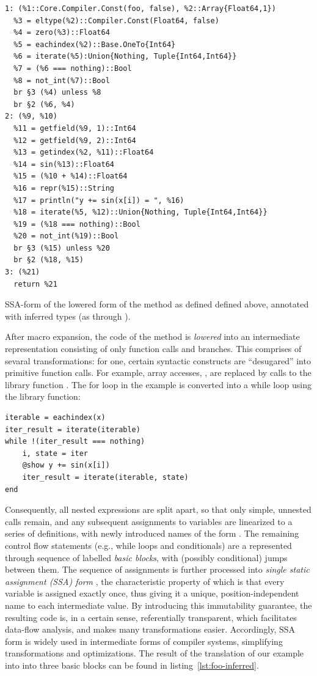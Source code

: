 \begin{lstfloat}[t]
\begin{lstlisting}[style=lstfloat]
1: (%1::Core.Compiler.Const(foo, false), %2::Array{Float64,1})
  %3 = eltype(%2)::Compiler.Const(Float64, false)
  %4 = zero(%3)::Float64
  %5 = eachindex(%2)::Base.OneTo{Int64}
  %6 = iterate(%5):Union{Nothing, Tuple{Int64,Int64}}
  %7 = (%6 === nothing)::Bool
  %8 = not_int(%7)::Bool
  br §3 (%4) unless %8
  br §2 (%6, %4)
2: (%9, %10)
  %11 = getfield(%9, 1)::Int64
  %12 = getfield(%9, 2)::Int64
  %13 = getindex(%2, %11)::Float64
  %14 = sin(%13)::Float64
  %15 = (%10 + %14)::Float64
  %16 = repr(%15)::String
  %17 = println("y += sin(x[i]) = ", %16)
  %18 = iterate(%5, %12)::Union{Nothing, Tuple{Int64,Int64}}
  %19 = (%18 === nothing)::Bool
  %20 = not_int(%19)::Bool
  br §3 (%15) unless %20
  br §2 (%18, %15)
3: (%21)
  return %21
\end{lstlisting}
  \caption{SSA-form of the lowered form of the method \protect{} as defined
    defined above, annotated with inferred types (as through
    \protect{}).\label{lst:foo-inferred}}
\end{lstfloat}

After macro expansion, the code of the method is \emph{lowered} into an intermediate
representation consisting of only function calls and branches.  This comprises of sevaral
transformations: for one, certain syntactic constructs are \enquote{desugared} into primitive
function calls.  For example, array accesses, , are replaced by calls to the library
function .  The for loop in the example is converted into a while loop using
the  library function:
\begin{lstlisting}
iterable = eachindex(x)
iter_result = iterate(iterable)
while !(iter_result === nothing)
    i, state = iter
    @show y += sin(x[i])
    iter_result = iterate(iterable, state)
end
\end{lstlisting}
Consequently, all nested expressions are split apart, so that only simple, unnested calls remain,
and any subsequent assignments to variables are linearized to a series of definitions, with newly
introduced names of the form .  The remaining control flow statements (e.g., while loops
and conditionals) are a represented through sequence of labelled \emph{basic blocks}, with (possibly
conditional) jumps between them.  The sequence of assignments is further processed into \emph{single
  static assignment (SSA) form} \parencite{singer2018static}, the characteristic property of which
is that every variable is assigned exactly once, thus giving it a unique, position-independent name
to each intermediate value.  By introducing this immutability guarantee, the resulting code is, in a
certain sense, referentially transparent, which facilitates data-flow analysis, and makes many
transformations easier.  Accordingly, SSA form is widely used in intermediate forms of compiler
systems, simplifying transformations and optimizations.  The result of the translation of our
example into into three basic blocks can be found in listing~\ref{lst:foo-inferred}.

